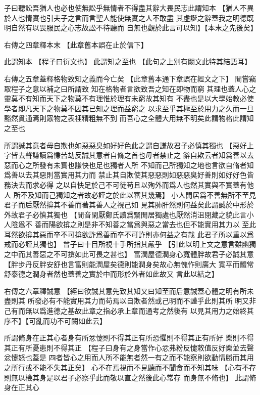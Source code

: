 \documentclass{zhvt-classic}
\begin{document}
子曰聽訟吾猶人也必也使無訟乎無情者不得盡其辭大畏民志此謂知本
  【猶人不異於人也情實也引夫子之言而言聖人能使無實之人不敢盡
    其虛誕之辭蓋我之明德既明自然有以畏服民之心志故訟不待聽而
    自無也觀於此言可以知】\zhvph【本末之先後矣】

\begin{preface}
右傳之四章釋本末
  【此章舊本誤在止於信下】
\end{preface}

此謂知本
  【程子曰衍文也】
此謂知之至也
  【此句之上別有闕文此特其結語耳】

\begin{preface}
右傳之五章蓋釋格物致知之義而今亡矣
  【此章舊本通下章誤在經文之下】
閒嘗竊取程子之意以補之曰所謂致
知在格物者言欲致吾之知在即物而窮
其理也蓋人心之靈莫不有知而天下之物莫不有理惟於理有未窮故其知有
不盡也是以大學始教必使學者即凡天下之物莫不因其已知之理而益窮之
以求至乎其極至於用力之久而一旦豁然貫通焉則眾物之表裡精粗無不到
而吾心之全體大用無不明矣此謂物格此謂知之至也
\end{preface}

所謂誠其意者毋自欺也如惡惡臭如好好色此之謂自謙故君子必慎其獨也
  【惡好上字皆去聲謙讀爲慊苦劫反誠其意者自脩之首也毋者禁止之
    辭自欺云者知爲善以去惡而心之所發有未實也謙快也足也獨者人所
    不知而己所獨知之地也言欲自脩者知爲善以去其惡則當實用其力而
    禁止其自欺使其惡惡則如惡惡臭好善則如好好色皆務決去而求必得
    之以自快足於己不可徒苟且以殉外而爲人也然其實與不實蓋有他人
    所不及知而己獨知之者故必謹之於此以審其幾焉】
小人閒居爲不善無所不至見君子而后厭然揜其不善而著其善人之視己如
見其肺肝然則何益矣此謂誠於中形於外故君子必慎其獨也
  【閒音閑厭鄭氏讀爲黶閒居獨處也厭然消沮閉藏之貌此言小人陰爲不
    善而陽欲揜之則是非不知善之當爲與惡之當去也但不能實用其力以
    至此耳然欲揜其惡而卒不可揜欲詐爲善而卒不可詐則亦何益之有哉
    此君子所以重以爲戒而必謹其獨也】
曾子曰十目所視十手所指其嚴乎
  【引此以明上文之意言雖幽獨之中而其善惡之不可揜如此可畏之甚也】
富潤屋德潤身心寬體胖故君子必誠其意
  【胖步丹反胖安舒也言富則能潤屋矣德則能潤身矣故心無愧怍則廣大
    寬平而體常舒泰德之潤身者然也蓋善之實於中而形於外者如此故又
    言此以結之】

\begin{preface}
右傳之六章釋誠意
  【經曰欲誠其意先致其知又曰知至而后意誠蓋心體之明有所未盡則其
    所發必有不能實用其力而苟焉以自欺者然或己明而不謹乎此則其所
    明又非己有而無以爲進德之基故此章之指必承上章而通考之然後有
    以見其用力之始終其序不】\zhvph【可亂而功不可闕如此云】
\end{preface}

所謂脩身在正其心者身有所忿懥則不得其正有所恐懼則不得其正有所好
樂則不得其正有所憂患則不得其正
  【程子曰身有之身當作心忿弗粉反懥敕值反好樂並去聲忿懥怒也蓋是
    四者皆心之用而人所不能無者然一有之而不能察則欲動情勝而其用
    之所行或不能不失其正矣】
心不在焉視而不見聽而不聞食而不知其味
  【心有不存則無以檢其身是以君子必察乎此而敬以直之然後此心常存
    而身無不脩也】
此謂脩身在正其心
\end{document}
